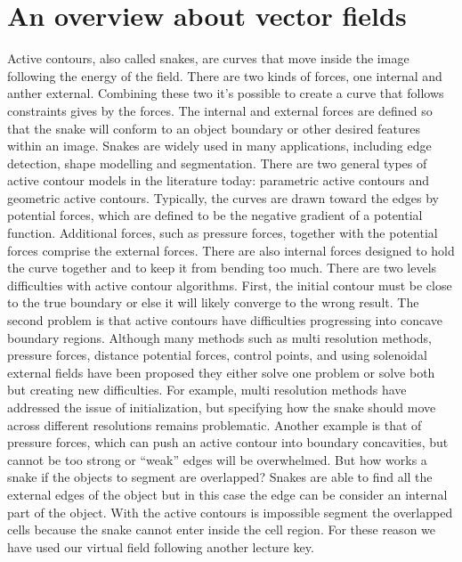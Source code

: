 
\chapter{An overview about vector fields}

Active contours, also called snakes, are curves that move inside the image following the energy of the field. There are two kinds of forces, one internal and anther external. Combining these two it's possible to create a curve that follows constraints gives by the forces. The  internal  and  external  forces  are  defined  so  that  the  snake  will conform to an object boundary or other desired features within an image. Snakes are widely used  in  many  applications,  including  edge  detection,  shape  modelling and segmentation. There  are  two  general  types  of  active  contour  models  in  the literature  today:  parametric active contours and geometric active contours. Typically,  the  curves  are  drawn  toward  the edges  by  potential  forces,  which  are  defined  to  be  the  negative  gradient  of  a  potential function.  Additional  forces,  such  as  pressure  forces,  together  with  the  potential  forces comprise the external forces. There are also internal forces designed to hold the curve together and to keep it from bending too  much.  There  are  two  levels  difficulties  with  active  contour  algorithms.  First,  the  initial contour must be close to the true boundary or else it will likely converge to the wrong result. The second problem is that active contours have difficulties progressing into concave  boundary  regions.  Although  many  methods  such  as  multi resolution  methods, pressure forces, distance potential forces, control points, and using solenoidal external fields have been proposed they either solve one problem or solve both but creating new difficulties. For  example,  multi resolution  methods  have  addressed  the  issue  of  initialization,  but specifying  how  the  snake  should  move  across  different  resolutions  remains  problematic. Another example is that of pressure forces, which can push an active contour into boundary concavities, but cannot be too strong or “weak” edges will be overwhelmed. But how works a snake if the objects to segment are overlapped? Snakes are able to find all the external edges of the object but in this case the edge can be consider an internal part of the object. With the active contours is impossible segment the overlapped cells because the snake cannot enter inside the cell region. For these reason we have used our virtual field following another lecture key.

